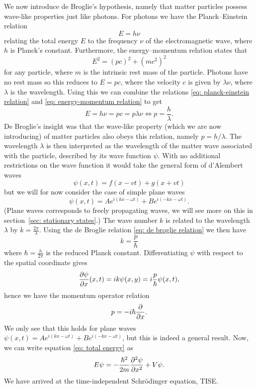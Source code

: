 We now introduce de Broglie's hypothesis, namely that matter particles possess wave-like properties just like photons. For photons we have the Planck--Einstein relation
\begin{equation}\label{eq: planck-einstein relation}
  E = h\nu
\end{equation}
relating the total energy $E$ to the frequency $\nu$ of the electromagnetic wave, where $h$ is Planck's constant. Furthermore, the energy--momentum relation states that
\begin{equation}\label{eq: energy-momentum relation}
  E^2 = (pc)^2 + (mc^2)^2
\end{equation}
for any particle, where $m$ is the intrinsic rest mass of the particle. Photons have no rest mass so this reduces to $E = pc$, where the velocity $c$ is given by $\lambda \nu$, where $\lambda$ is the wavelength. Using this we can combine the relations \eqref{eq: planck-einstein relation} and \eqref{eq: energy-momentum relation} to get
\begin{equation}\label{eq: de broglie relation}
  E = h \nu = pc = p \lambda \nu \iff p = \frac{h}{\lambda}.
\end{equation}
De Broglie's insight was that the wave-like property (which we are now introducing) of matter particles also obeys this relation, namely $p = h/\lambda$. The wavelength $\lambda$ is then interpreted as the wavelength of the matter wave associated with the particle, described by its wave function $\psi$. With no additional restrictions on the wave function it would take the general form of d'Alembert waves
\[ \psi(x, t) = f(x - vt) + g(x + vt) \]
but we will for now consider the case of simple plane waves
\[ \psi(x, t) = Ae^{i(kx - \omega t)} + Be^{i(-kx - \omega t)}. \]
(Plane waves corresponds to freely propagating waves, we will see more on this in section~\ref{sec: stationary states}.)
The wave number $k$ is related to the wavelength $\lambda$ by $k = \frac{2\pi}{\lambda}$. Using the de Broglie relation \eqref{eq: de broglie relation} we then have
\begin{equation}\label{eq: k-p relation}
  k = \frac{p}{\hbar}
\end{equation}
where $\hbar = \frac{h}{2\pi}$ is the reduced Planck constant.
Differentiating $\psi$ with respect to the spatial coordinate gives
\[ \frac{\partial\psi}{\partial x}(x, t) = ik\psi(x, y) = i\frac{p}{\hbar} \psi(x, t), \]
hence we have the momentum operator relation
\[ p = -i\hbar\frac{\partial}{\partial x}. \]
We only see that this holds for plane waves $\psi(x, t) = Ae^{i(kx - \omega t)} + Be^{i(-kx - \omega t)}$, but this is indeed a general result.
Now, we can write equation \eqref{eq: total energy} as
\begin{equation}\label{eq: tise}
  E \psi = -\frac{\hbar^2}{2m}\frac{\partial^2\psi}{\partial x^2} + V\psi.
\end{equation}
We have arrived at the time-independent Schrödinger equation, TISE.

